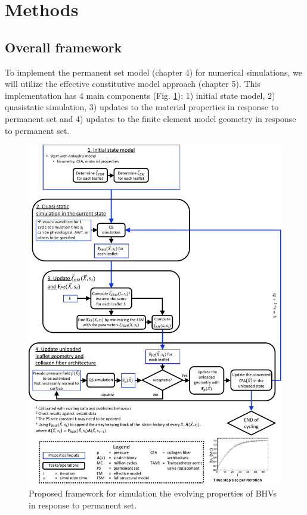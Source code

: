 \section{Methods}

\subsection{Overall framework}

    To implement the permanent set model (chapter 4) for numerical simulations, we will utilize the effective constitutive model approach (chapter 5). This implementation has 4 main components (Fig. \ref{c6:fig:pssimoverview}): 1) initial state model, 2) quasistatic simulation, 3) updates to the material properties in response to permanent set and 4) updates to the finite element model geometry in response to permanent set. 
    
    
\begin{figure}
\centering
\includegraphics[width=5.5in]{Images/chapter6/pssimoverview.pdf}
\caption{Proposed framework for simulation the evolving properties of BHVs in response to permanent set.}
\label{c6:fig:pssimoverview}
\end{figure}

